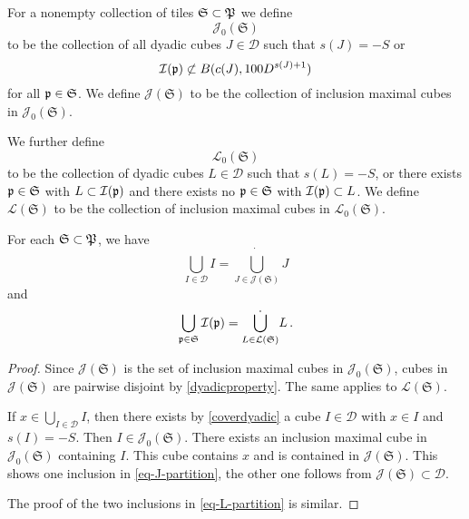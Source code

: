 {For a nonempty collection of tiles $\mathfrak{S} \subset {\mathfrak P}$ we define
$$
    \mathcal{J}_0(\mathfrak{S})
$$
to be the collection of all dyadic cubes $J \in \mathcal{D}$ such that $s(J) = -S$ or
$$
    {\mathcal{I}}({\mathfrak p}) \not\subset B(c(J), 100D^{s(J) + 1})
$$
for all ${\mathfrak p} \in \mathfrak{S}$. We define $\mathcal{J}(\mathfrak{S})$ to be the collection of inclusion maximal cubes in $\mathcal{J}_0(\mathfrak{S})$.

We further define
$$
    \mathcal{L}_0(\mathfrak{S})
$$
to be the collection of dyadic cubes $L \in \mathcal{D}$ such that $s(L) = -S$, or there exists ${\mathfrak p} \in \mathfrak{S}$ with $L \subset {\mathcal{I}}({\mathfrak p})$ and there exists no ${\mathfrak p} \in \mathfrak{S}$ with ${\mathcal{I}}({\mathfrak p}) \subset L$. We define $\mathcal{L}(\mathfrak{S})$ to be the collection of inclusion maximal cubes in $\mathcal{L}_0(\mathfrak{S})$.

\begin{lemma}
    \label{dyadic-partitions}
    For each $\mathfrak{S} \subset {\mathfrak P}$, we have
    \begin{equation}
        \label{eq-J-partition}
        \bigcup_{I \in \mathcal{D}} I = \dot{\bigcup_{J \in \mathcal{J}(\mathfrak{S})}} J
    \end{equation}
    and
    \begin{equation}
        \label{eq-L-partition}
        \bigcup_{{\mathfrak p}\in \mathfrak{S}} {\mathcal{I}}({\mathfrak p}) = \dot{\bigcup_{L \in \mathcal{L}(\mathfrak{S})}} L\,.
    \end{equation}
\end{lemma}

\begin{proof}
    Since $\mathcal{J}(\mathfrak{S})$ is the set of inclusion maximal cubes in $\mathcal{J}_0(\mathfrak{S})$, cubes in $\mathcal{J}(\mathfrak{S})$ are pairwise disjoint by \eqref{dyadicproperty}. The same applies to $\mathcal{L}(\mathfrak{S})$.

    If $x \in \bigcup_{I \in \mathcal{D}} I$, then there exists by \eqref{coverdyadic} a cube $I \in \mathcal{D}$ with $x \in I$ and $s(I) = -S$. Then $I \in \mathcal{J}_0(\mathfrak{S})$. There exists an inclusion maximal cube in $\mathcal{J}_0(\mathfrak{S})$ containing $I$. This cube contains $x$ and is contained in $\mathcal{J}(\mathfrak{S})$. This shows one inclusion in \eqref{eq-J-partition}, the other one follows from $\mathcal{J}(\mathfrak{S}) \subset \mathcal{D}$.

    The proof of the two inclusions in \eqref{eq-L-partition} is similar.
\end{proof}

}
